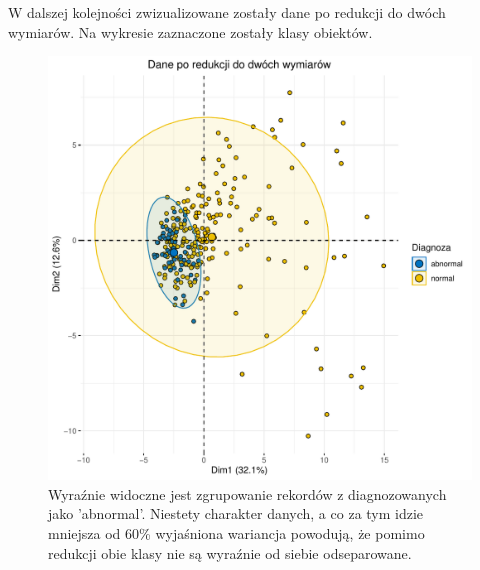 \documentclass[10pt,a4paper]{article}
\begin{document}
W dalszej kolejności zwizualizowane zostały dane po redukcji do dwóch wymiarów. Na wykresie zaznaczone zostały klasy obiektów.

\begin{figure}[H]
\includegraphics[scale=0.5]{klasy.pdf}
\caption{Wyraźnie widoczne jest zgrupowanie rekordów z diagnozowanych jako 'abnormal'. Niestety charakter danych, a co za tym idzie mniejsza od 60\% wyjaśniona wariancja powodują, że pomimo redukcji obie klasy nie są wyraźnie od siebie odseparowane.}
\end{figure}
\end{document}
